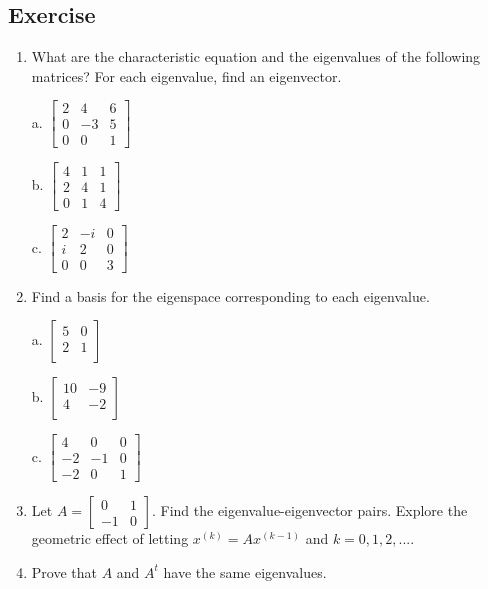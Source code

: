 \documentclass[aima104_lecturenotes_ku.tex]{subfiles}
\begin{document}
\subsection{Exercise}
\begin{enumerate}
\item What are the characteristic equation and the eigenvalues of the following matrices? For each eigenvalue, find an eigenvector.
  \begin{multicols}{3}
    a. $\begin{bmatrix}
      2 & 4 & 6 \\
      0 & -3 & 5 \\
      0 & 0 & 1
    \end{bmatrix}$

    \columnbreak

    b. $\begin{bmatrix}
      4 & 1 & 1 \\
      2 & 4 & 1 \\
      0 & 1 & 4
    \end{bmatrix}$
    \columnbreak

    c. $\begin{bmatrix}
      2 & -i & 0 \\
      i & 2 & 0 \\
      0 & 0 & 3
    \end{bmatrix}$
  \end{multicols}

\item Find a basis for the eigenspace corresponding to each eigenvalue.
  \begin{multicols}{3}
    a. $\begin{bmatrix}
      5 & 0  \\
      2 & 1  \\
    \end{bmatrix}$

    \columnbreak

    b. $\begin{bmatrix}
      10 & -9 \\
      4 & -2  \\
    \end{bmatrix}$
    \columnbreak

    c. $\begin{bmatrix}
      4 & 0 & 0 \\
      -2 & -1 & 0 \\
      -2 & 0 & 1
    \end{bmatrix}$
  \end{multicols}

\item Let $A= \begin{bmatrix}
  0 & 1 \\
  -1 & 0
\end{bmatrix}$. Find the eigenvalue-eigenvector pairs. Explore the geometric effect of letting $\displaystyle x^{(k)}=Ax^{(k-1)}$ and $k=0,1,2,...$.\

\item Prove that $A$ and $A^{t}$ have the same eigenvalues.
\end{enumerate}
\end{document}
